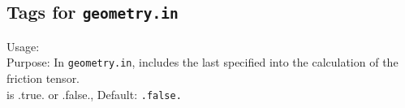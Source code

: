 \subsection*{Tags for \texttt{geometry.in}}

{
  \noindent 
  Usage:   \\[1.0ex]
  Purpose: In \texttt{geometry.in}, includes the last
    specified  into the calculation of the friction tensor.\\[1.0ex]
   is .true. or .false., Default: \texttt{.false.} \\
}

